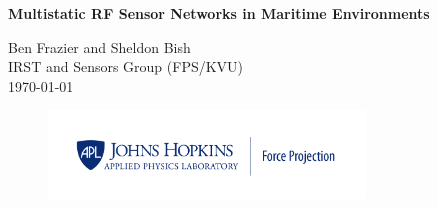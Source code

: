 \titlepage
\thispagestyle{fancy}
\begin{center}
\vspace*{50pt}
{\huge \bfseries Multistatic RF Sensor Networks in Maritime Environments\\}
\vspace{75 pt}

\Large Ben Frazier and Sheldon Bish \\
\large IRST and Sensors Group (FPS/KVU)\\
\vspace{25pt}
\large \today \\

\begin{figure}[!b]
\begin{center}
\includegraphics[width=0.75\textwidth]{../media/FP_Blue.png}
\end{center}
\end{figure}

\end{center}
